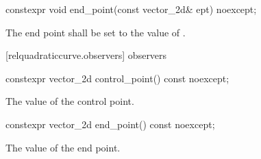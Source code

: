 \begin{itemdecl}
constexpr void end_point(const vector_2d& ept) noexcept;
\end{itemdecl}
\begin{itemdescr}
\pnum
\effects
The end point shall be set to the value of .
\end{itemdescr}

 [relquadraticcurve.observers]{ observers}

\begin{itemdecl}
constexpr vector_2d control_point() const noexcept;
\end{itemdecl}
\begin{itemdescr}
\pnum
\returns
The value of the control point.
\end{itemdescr}

\begin{itemdecl}
constexpr vector_2d end_point() const noexcept;
\end{itemdecl}
\begin{itemdescr}
\pnum
\returns
The value of the end point.
\end{itemdescr}

